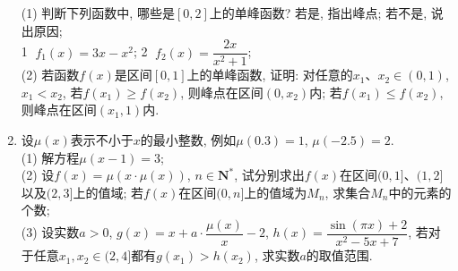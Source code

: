 \documentclass[10pt,a4paper]{article}
\begin{document}
\begin{enumerate}[1.]
(1) 判断下列函数中, 哪些是$[0,2]$上的单峰函数? 若是, 指出峰点; 若不是, 说出原因;\\
\textcircled{1}  $f_1(x)=3x-x^2$; \textcircled{2}  $f_2(x)=\dfrac{2x}{{x^2}+1}$;\\
(2) 若函数$f(x)$是区间$[0,1]$上的单峰函数, 证明: 对任意的$x_1$、$x_2\in (0,1)$, $x_1<x_2$, 若$f(x_1)\ge f(x_2)$, 则峰点在区间$(0,x_2)$内; 若$f(x_1)\le f(x_2)$, 则峰点在区间$(x_1,1)$内.
\item 设$\mu (x)$表示不小于$x$的最小整数, 例如$\mu(0.3)=1$, $\mu(-2.5)=2$.\\
(1) 解方程$\mu(x-1)=3$;\\
(2) 设$f(x)=\mu (x\cdot \mu (x))$, $n\in \mathbf{N}^*$, 试分别求出$f(x)$在区间$(0,1]$、$(1,2]$以及$(2,3]$上的值域; 若$f(x)$在区间$(0,n]$上的值域为$M_n$, 求集合$M_n$中的元素的个数;\\
(3) 设实数$a>0$, $g(x)=x+a\cdot \dfrac{\mu (x)}x-2$, $h(x)=\dfrac{\sin (\pi x)+2}{x^2-5x+7}$, 若对于任意$x_1,x_2\in (2,4]$都有$g(x_1)>h(x_2)$, 求实数$a$的取值范围.


\end{enumerate}
\end{document}

